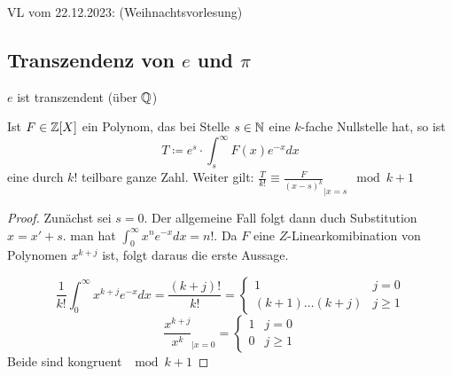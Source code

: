 \documentclass[../main.tex]{subfiles}
\begin{document}
\begin{flushright}
VL vom 22.12.2023: (Weihnachtsvorlesung)
\end{flushright}

\subsection{Transzendenz von $e$ und $\pi$}
\begin{theorem}
    $e$ ist transzendent (über $\mathbb{Q}$)
\end{theorem}
\begin{lemma}
    Ist $F\in \mathbb{Z}[X]$ ein Polynom, das bei Stelle $s\in\mathbb{N}$ eine $k$-fache Nullstelle hat, so ist $$T\coloneqq e^s\cdot \int_s^\infty F(x)e^{-x} dx$$
    eine durch $k!$ teilbare ganze Zahl.
    Weiter gilt: $\frac{T}{k!} \equiv \frac{F}{(x-s)^k}_{|x=s} \mod k+1$
\end{lemma}
\begin{proof}
    Zunächst sei $s=0$. 
    Der allgemeine Fall folgt dann duch Substitution $x=x'+s$.
    man hat $\int_0^\infty x^n e^{-x} dx = n!$.
    Da $F$ eine $Z$-Linearkomibination von Polynomen $x^{k+j}$ ist, folgt daraus die erste Aussage.

    $$\frac{1}{k!}\int_0^\infty x^{k+j}e^{-x}dx = \frac{(k+j)!}{k!} = \begin{cases}
        1 &  j=0\\
        (k+1)\dots(k+j) & j\geq 1
    \end{cases}$$
    $$\frac{x^{k+j}}{x^k}_{|x=0} = \begin{cases}
        1&j=0\\
        0 & j \geq 1
    \end{cases}$$
    Beide sind kongruent $\mod k+1$
\end{proof}
\end{document}
